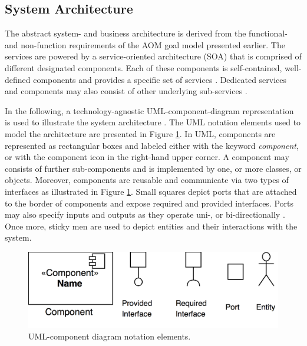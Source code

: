 \documentclass{llncs}
\begin{document}
{		\subsection{System Architecture}
			\label{ss:component-diagrams}

			The abstract system- and business architecture is derived from the functional- and non-function requirements of the AOM goal model presented earlier. The services are powered by a service-oriented architecture (SOA) that is comprised of different designated components. Each of these components is self-contained, well-defined components and provides a specific set of services \cite{erl2005service}\cite{perrey2003service}. Dedicated services and components may also consist of other underlying sub-services \cite{rosen2012applied}. 
			
			In the following, a technology-agnostic UML-component-diagram representation is used to illustrate the system architecture \cite{booch1996unified}\cite{specification2007omg}. The UML notation elements used to model the architecture are presented in Figure \ref{fig:uml-component-diagram-overview}. In UML, components are represented as rectangular boxes and labeled either with the keyword \textit{component}, or with the component icon in the right-hand upper corner. A component may consists of further sub-components and is implemented by one, or more classes, or objects. Moreover, components are reusable and communicate via two types of interfaces as illustrated in Figure \ref{fig:uml-component-diagram-overview}. Small squares depict ports that are attached to the border of components and expose required and provided interfaces. Ports may also specify inputs and outputs as they operate uni-, or bi-directionally \cite{booch1996unified}\cite{specification2007omg}. Once more, sticky men are used to depict entities and their interactions with the system. 
			
			\begin{figure}[H]
				\centering
				\includegraphics[scale=0.12]{Figures/UML-notation-elements.png}
				\caption{UML-component diagram notation elements.}	
				\label{fig:uml-component-diagram-overview}
			\end{figure}	
			
}
\end{document}
